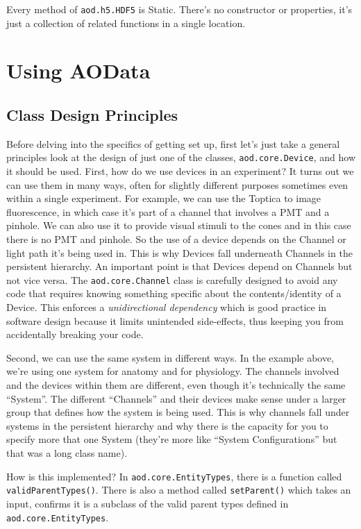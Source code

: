 \documentclass[10pt]{exam}
\newcommand\aodclass[1]{\textcolor{codeblue}{\texttt{#1}}}
\newcommand\aodfcn[1]{\textcolor{darkteal}{\texttt{#1}}}
\begin{document}
		Every method of \aodclass{aod.h5.HDF5} is Static. There's no constructor or properties, it's just a collection of related functions in a single location. 
	 
	
\section{Using AOData}
	\subsection{Class Design Principles}\label{subsection:ClassDesign}
		\noindent Before delving into the specifics of getting set up, first let's just take a general principles look at the design of just one of the classes, \aodclass{aod.core.Device}, and how it should be used. 
		First, how do we use devices in an experiment? It turns out we can use them in many ways, often for slightly different purposes sometimes even within a single experiment. For example, we can use the Toptica to image fluorescence, in which case it's part of a channel that involves a PMT and a pinhole. We can also use it to provide visual stimuli to the cones and in this case there is no PMT and pinhole. So the use of a device depends on the Channel or light path it's being used in. This is why Devices fall underneath Channels in the persistent hierarchy. An important point is that Devices depend on Channels but not vice versa. The \aodclass{aod.core.Channel} class is carefully designed to avoid any code that requires knowing something specific about the contents/identity of a Device. This enforces a \textit{unidirectional dependency} which is good practice in software design because it limits unintended side-effects, thus keeping you from accidentally breaking your code. 
		
		Second, we can use the same system in different ways. In the example above, we're using one system for anatomy and for physiology. The channels involved and the devices within them are different, even though it's technically the same ``System''. The different ``Channels'' and their devices make sense under a larger group that defines how the system is being used. This is why channels fall under systems in the persistent hierarchy and why there is the capacity for you to specify more that one System (they're more like ``System Configurations'' but that was a long class name).  
		
		How is this implemented? In \aodclass{aod.core.EntityTypes}, there is a function called \aodfcn{validParentTypes()}. 
		There is also a method called \aodfcn{setParent()} which takes an input, confirms it is a subclass of the valid parent types defined in \aodclass{aod.core.EntityTypes}.
		
\end{document}
